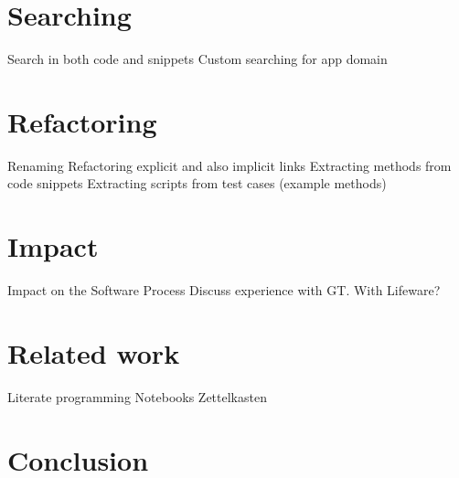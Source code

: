 \documentclass[acmsmall,screen,authorversion,nonacm]{acmart} %
\begin{document}
\section{Searching}\label{sec:searching}
\begin{code}
	Search in both code and snippets
	Custom searching for app domain
\end{code}


\section{Refactoring}\label{sec:refactoring}
\begin{code}
	Renaming
		Refactoring explicit and also implicit links
	Extracting methods from code snippets
	Extracting scripts from test cases (example methods)
\end{code}


\section{Impact}\label{sec:impact}
\begin{code}
Impact on the Software Process
Discuss experience with GT. With Lifeware?
\end{code}


\section{Related work}\label{sec:related}
\begin{code}
	Literate programming
		Notebooks
	Zettelkasten
\end{code}


\section{Conclusion}\label{sec:conclusion}







\end{document}

